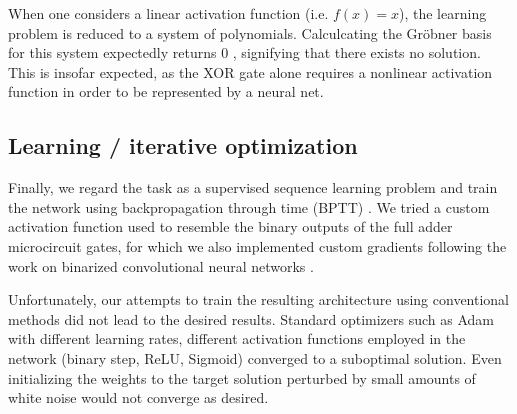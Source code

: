 \documentclass{article}
\begin{document}
When one considers a linear activation function (i.e. $f(x) = x$), the learning problem is reduced to a system of polynomials. Calculcating the Gr\"obner basis for this system expectedly returns 0 \cite{buchberger2006bruno}, signifying that there exists no solution. This is insofar expected, as the XOR gate alone requires a nonlinear activation function in order to be represented by a neural net. %


\subsection{Learning / iterative optimization}

Finally, we regard the task as a supervised sequence learning problem and train the network using backpropagation through time (BPTT) \cite{rumelhart1986learning}. We tried a custom activation function used to resemble the binary outputs of the full adder microcircuit gates, for which we also implemented custom gradients following the work on binarized convolutional neural networks \cite{RastegariORF16,DBLP:journals/corr/CourbariauxB16}.

Unfortunately, our attempts to train the resulting architecture using conventional methods did not lead to the desired results. Standard optimizers such as Adam with different learning rates, different activation functions employed in the network (binary step, ReLU, Sigmoid) converged to a suboptimal solution. Even initializing the weights to the target solution perturbed by small amounts of white noise would not converge as desired.
\end{document}
